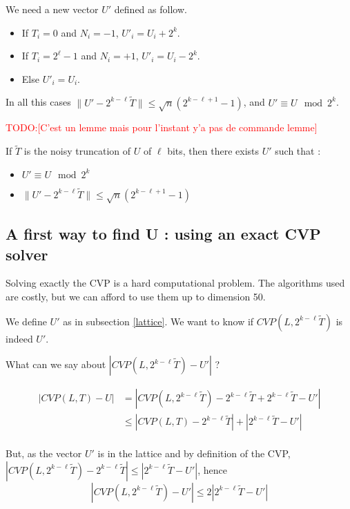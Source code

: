 \documentclass[submission,svgnames,journal=tosc]{iacrtrans}
\newcommand{\todo}[1]{\textcolor{red}{TODO:[#1]}}
\begin{document}
	We need a new vector \(U'\) defined as follow.
\begin{itemize}
	\item If \(T_i = 0\) and \(N_i = -1\), \(U'_i=U_i+2^k\).
	\item If \(T_i = 2^\ell - 1\) and \(N_i = +1\), \(U'_i=U_i-2^k\).
	\item Else \(U'_i=U_i\).
\end{itemize}
In all this cases \(\lVert U' -2^{k-\ell} \widetilde{T} \rVert \leqslant \sqrt{n}(2^{k-\ell+1}-1) \), and \(U' \equiv U \mod 2^k \).

\todo{C'est un lemme mais pour l'instant y'a pas de commande lemme}
\begin{theorem}
	If $\widetilde{T}$ is the noisy truncation of \(U\) of \(\ell\) bits, then there exists \(U'\) such that :
	\begin{itemize}
		\item \(U'\equiv U \mod 2^k\)
		\item \(\lVert U' -2^{k-\ell} \widetilde{T} \rVert \leqslant \sqrt{n}(2^{k-\ell+1}-1) \)
	\end{itemize}
\end{theorem}


\subsection{A first way to find U : using an exact CVP solver}

Solving exactly the CVP is a hard computational problem. The algorithms used are costly, but we can afford to use them up to dimension 50.

We define \(U'\) as in subsection \ref{lattice}. We want to know if \(CVP(L,2^{k-\ell}\widetilde{T})\) is indeed \(U'\).

What can we say about \(|CVP(L,2^{k-\ell}\widetilde{T})-U'|\) ?

\begin{align*}
|CVP(L,T)-U| &= |CVP(L,2^{k-\ell}\widetilde{T})-2^{k-\ell}\widetilde{T}+2^{k-\ell}\widetilde{T}-U'|\\
& \leqslant |CVP(L,T)-2^{k-\ell}\widetilde{T}|+|2^{k-\ell}\widetilde{T}-U'|\\
\end{align*}

But, as the vector \(U'\) is in the lattice and by definition of the CVP, \(|CVP(L,2^{k-\ell}\widetilde{T})-2^{k-\ell}\widetilde{T}| \leqslant |2^{k-\ell}\widetilde{T}-U'| \), hence 
\[|CVP(L,2^{k-\ell}\widetilde{T})-U'|\leqslant 2|2^{k-\ell}\widetilde{T}-U'|\]
\end{document}
